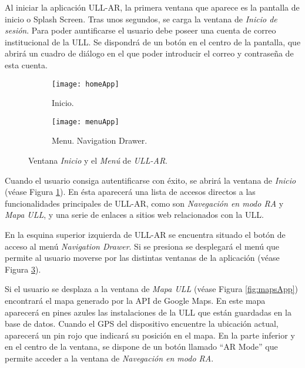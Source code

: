 Al iniciar la aplicación ULL-AR, la primera ventana que aparece es la pantalla de inicio o Splash Screen. Tras unos segundos, se carga la ventana de \textit{Inicio de sesión}. Para poder auntificarse el usuario debe poseer una cuenta de correo institucional de la ULL.
Se dispondrá de un botón en el centro de la pantalla, que abrirá un cuadro de diálogo en el que poder introducir el correo y contraseña de esta cuenta.
  
\begin{figure}[h]
    \hspace*{\fill}%
    \begin{subfigure}[h]{0.35\linewidth}
    \texttt{[image: homeApp]}
    \caption{Inicio.}
    \label{fig:homeApp}
    \end{subfigure} 
    \hfill%
    \begin{subfigure}[h]{0.35\linewidth}
    \texttt{[image: menuApp]}
    \caption{Menu. Navigation Drawer.}
    \label{fig:menuApp}
    \end{subfigure}%
    \caption{Ventana \textit{Inicio} y el \textit{Menú} de \textit{ULL-AR}.}
    \hspace*{\fill}%
\end{figure}

Cuando el usuario consiga autentificarse con éxito, se abrirá la ventana de \textit{Inicio} (véase Figura \ref{fig:homeApp}). En ésta aparecerá una lista de accesos directos a las funcionalidades principales de ULL-AR, como son \textit{Navegación en modo RA} y \textit{Mapa ULL}, y una serie de enlaces a sitios web relacionados con la ULL.

En la esquina superior izquierda de ULL-AR se encuentra situado el botón de acceso al menú \textit{Navigation Drawer}. Si se presiona se desplegará el menú que permite al usuario moverse por las distintas ventanas de la aplicación (véase Figura \ref{fig:menuApp}).

Si el usuario se desplaza a la ventana de \textit{Mapa ULL} (véase Figura \ref{fig:mapsApp}) encontrará el mapa generado por la API de Google Maps. En este mapa aparecerá en pines azules las instalaciones de la ULL que están guardadas en la base de datos. Cuando el GPS del dispositivo encuentre la ubicación actual, aparecerá un pin rojo que indicará su posición en el mapa. En la parte inferior y en el centro de la ventana, se dispone de un botón llamado ``AR Mode'' que permite acceder a la ventana de \textit{Navegación en modo RA}.
  
